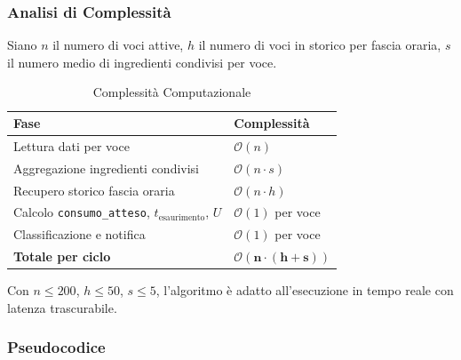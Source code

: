 \subsubsection*{Analisi di Complessità}
Siano $n$ il numero di voci attive, $h$ il numero di voci in storico per fascia oraria, $s$ il numero medio di ingredienti condivisi per voce.

\begin{table}[htbp]
\centering
\caption{Complessità Computazionale}
\label{tab:complessita_predittore}
\small
\begin{tabular}{ll}
\toprule
\textbf{Fase} & \textbf{Complessità} \\
\midrule
Lettura dati per voce & $\mathcal{O}(n)$ \\
Aggregazione ingredienti condivisi & $\mathcal{O}(n \cdot s)$ \\
Recupero storico fascia oraria & $\mathcal{O}(n \cdot h)$ \\
Calcolo \texttt{consumo\_atteso}, $t_{\text{esaurimento}}$, $U$ & $\mathcal{O}(1)$ per voce \\
Classificazione e notifica & $\mathcal{O}(1)$ per voce \\
\midrule
\textbf{Totale per ciclo} & $\mathbf{\mathcal{O}(n \cdot (h + s))}$ \\
\bottomrule
\end{tabular}
\end{table}

Con $n \le 200$, $h \le 50$, $s \le 5$, l'algoritmo è adatto all'esecuzione in tempo reale con latenza trascurabile.

\subsubsection*{Pseudocodice}


